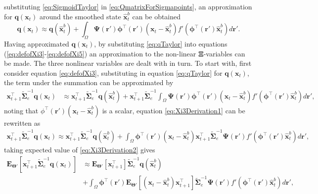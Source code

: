 \documentclass[]{article}
\begin{document}
substituting \eqref{eq:SigmoidTaylor} in \eqref{eq:QmatrixForSigmapoints},  an approximation for $\mathbf q(\mathbf x_t)$ around the smoothed state $\hat{\mathbf{x}}_t^b$ can be obtained
\begin{equation}\label{eq:qTaylor}
 \mathbf q(\mathbf x_t) \approx \mathbf q(\hat{\mathbf x}_t^b)+\int_\Omega \boldsymbol{\Psi}\left(\mathbf{r}'\right)\boldsymbol \phi^\top\left(\mathbf r'\right) \left(\mathbf x_t -\hat{\mathbf x}_t^b\right)f'\left(\boldsymbol \phi^\top\left(\mathbf r'\right)\hat{\mathbf x}_t^b\right) d\mathbf{r}'.
\end{equation}
Having approximated $\mathbf q\left(\mathbf x_t\right)$, by substituting  \eqref{eq:qTaylor} into equations (\ref{eq:defofXi3}-\ref{eq:defofXi5}) an approximation to the non-linear $\boldsymbol\Xi$-variables can be made. The three nonlinear variables are dealt with in turn. To start with, first consider equation \eqref{eq:defofXi3}, substituting in equation \eqref{eq:qTaylor} for $\mathbf q\left(\mathbf x_t\right)$, the term under the summation can be approximated by
\begin{align}\label{eq:Xi3Derivation1}
 \mathbf x_{t+1}^\top\tilde{\boldsymbol\Sigma}_e^{-1}\mathbf q( \mathbf x_t) &\approx \mathbf x_{t+1}^\top\tilde{\boldsymbol\Sigma}_e^{-1}\mathbf q(\mathbf {\hat x}_t^b)+\mathbf x_{t+1}^\top\tilde{\boldsymbol\Sigma}_e^{-1}\int_\Omega \boldsymbol{\Psi}(\mathbf{r}')\boldsymbol \phi^\top(\mathbf r') (\mathbf x_t - \mathbf  {\hat x}_t^b)f'(\boldsymbol \phi^\top(\mathbf r')\mathbf {\hat x}_t^b) d\mathbf{r}',
\end{align}
noting that $\phi^\top(\mathbf r') (\mathbf x_t - \mathbf  {\hat x}_t^b)$ is a scalar, equation \eqref{eq:Xi3Derivation1} can be rewritten as 
\begin{align}\label{eq:Xi3Derivation2}
 \mathbf x_{t+1}^\top\tilde{\boldsymbol\Sigma}_e^{-1}\mathbf q( \mathbf x_t)\approx\mathbf x_{t+1}^\top\tilde{\boldsymbol\Sigma}_e^{-1}\mathbf q(\mathbf {\hat x}_t^b)+\int_\Omega \boldsymbol \phi^\top(\mathbf r') (\mathbf x_t - \mathbf  {\hat x}_t^b)\mathbf x_{t+1}^\top\tilde{\boldsymbol\Sigma}_e^{-1}\boldsymbol{\Psi}(\mathbf{r}')f'(\boldsymbol \phi^\top(\mathbf r')\mathbf {\hat x}_t^b) d\mathbf{r}',
\end{align}
taking expected value of \eqref{eq:Xi3Derivation2} gives
\begin{align}\label{eq:Xi3Derivation3}
 \mathbf E_{\boldsymbol\Theta'}\left[\mathbf x_{t+1}^\top\tilde{\boldsymbol\Sigma}_e^{-1}\mathbf q( \mathbf x_t)\right] &\approx \mathbf E_{\boldsymbol\Theta'}\left[\mathbf x_{t+1}^\top\right]\tilde{\boldsymbol\Sigma}_e^{-1}\mathbf q(\mathbf {\hat x}_t^b) \nonumber \\
&+\int_\Omega \boldsymbol \phi^\top(\mathbf r')  \mathbf E_{\boldsymbol\Theta'}\left[(\mathbf x_t - \mathbf  {\hat x}_t^b)\mathbf x_{t+1}^\top\right]\tilde{\boldsymbol\Sigma}_e^{-1}\boldsymbol{\Psi}(\mathbf{r}')f'(\boldsymbol \phi^\top(\mathbf r')\mathbf {\hat x}_t^b) d\mathbf{r}',
\end{align}
\end{document}
